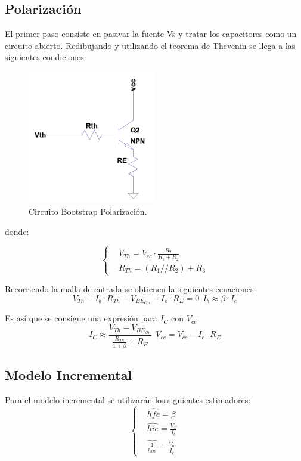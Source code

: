 \documentclass[a4paper]{article}
\begin{document}
\subsection{Polarización}
El primer paso consiste en pasivar la fuente Vs y tratar los capacitores como un circuito abierto. Redibujando y utilizando el teorema de Thevenin se llega a las siguientes condiciones:
\begin{figure} [H]
	\centering
	\includegraphics[width=0.5\textwidth]{imagenes/polarizacion.PNG}
	\caption{Circuito Bootstrap Polarización.}
	\label{fig:pol}
\end{figure}
donde:

\begin{equation*}
\left\{
\begin{aligned}
		& V_{Th}= V_{cc}\cdot \frac{R_2}{R_1+R_2} \\
		& R_{Th}= (R_1 // R_2) + R_3 
\end{aligned}
\right.
\end{equation*}

Recorriendo la malla de entrada se obtienen la siguientes ecuaciones:
\begin{equation*}
	V_{Th}-I_b \cdot R_{Th} -V_{BE_{On}}-I_e \cdot R_E=0  \ \  I_b\approx  \beta \cdot I_e
\end{equation*}

Es así que se consigue una expresión para $I_C$ con $V_{ce}$:
\begin{equation*}
	I_{C}\approx \frac{V_{Th}-V_{BE_{On}}}{\frac{R_{Th}}{1+\beta}+R_E} \ \ V_{ce} = V_{cc}-I_c\cdot R_E
\end{equation*}

\subsection{Modelo Incremental}
Para el modelo incremental se utilizarán los siguientes estimadores:
\begin{equation*}
\left\{
\begin{aligned}
	& \hat{hfe}=\beta \\
	& \hat{hie} = \frac{V_T}{I_b} \\
	& \hat{\frac{1}{hoe}} = \frac{V_a}{I_c}
\end{aligned}
\right.
\end{equation*}
\end{document}
